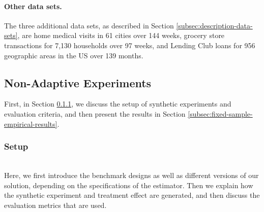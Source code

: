 \paragraph{Other data sets.} The three additional data sets, as described in Section \ref{subsec:description-data-sets}, are home medical visits in 61 cities over 144 weeks, grocery store transactions for 7,130 households over 97 weeks, and Lending Club loans for 956 geographic areas in the US over 139 months.

\subsection{Non-Adaptive Experiments}\label{subsec:empirical-fixed-sample-size}
First, in Section \ref{subsec:experiment-setup}, we discuss the setup of synthetic experiments and evaluation criteria, and then present the results in Section \ref{subsec:fixed-sample-empirical-results}. 

\subsubsection{Setup}\label{subsec:experiment-setup}
\texttt{} \\
Here, we first introduce the benchmark designs as well as different versions of our solution, depending on the specifications of the estimator. Then we explain how the synthetic experiment and treatment effect are generated, and then discuss the evaluation metrics that are used.

